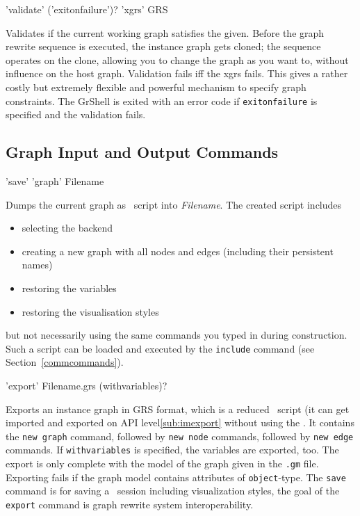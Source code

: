 \begin{rail}
  'validate' ('exitonfailure')? 'xgrs' GRS
\end{rail}
Validates if the current working graph satisfies the  given.
Before the graph rewrite sequence is executed, the instance graph gets cloned;
the sequence operates on the clone, allowing you to change the graph as you want to, without influence on the host graph.
Validation fails iff the xgrs fails.
This gives a rather costly but extremely flexible and powerful mechanism to specify graph constraints.
The GrShell is exited with an error code if \texttt{exitonfailure} is specified and the validation fails.


\subsection{Graph Input and Output Commands}
\label{outputcmds}

\begin{rail}
  'save' 'graph' Filename
\end{rail}
Dumps the current graph as \GrShell\ script into \emph{Filename}.
The created script includes
\begin{itemize}
  \item selecting the backend
  \item creating a new graph with all nodes and edges (including their persistent names)
  \item restoring the variables
  \item restoring the visualisation styles
\end{itemize}
but not necessarily using the same commands you typed in during construction. 
Such a script can be loaded and executed by the \texttt{include} command (see Section~\ref{commcommands}).

\begin{rail}
  'export' Filename.grs (withvariables)?
\end{rail}
Exports an instance graph in GRS format, which is a reduced \GrShell\ script (it can get imported and exported on API level\ref{sub:imexport} without using the \GrShell\).
It contains the \texttt{new graph} command, followed by \texttt{new node} commands, followed by \texttt{new edge} commands.
If \texttt{withvariables} is specified, the variables are exported, too.
The export is only complete with the model of the graph given in the \texttt{.gm} file.
Exporting fails if the graph model contains attributes of \texttt{object}-type.
The \texttt{save} command is for saving a \GrShell\ session including visualization styles, the goal of the \texttt{export} command is graph rewrite system interoperability.

